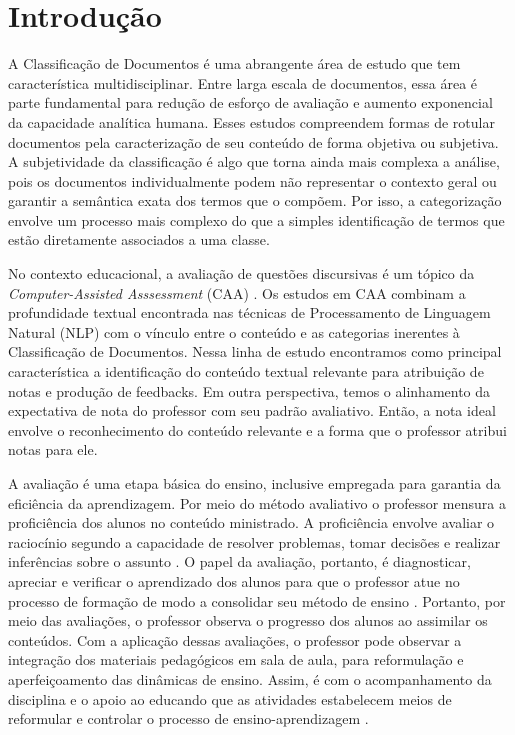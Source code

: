 \chapter{Introdução}
\label{cap1-intro}

A Classificação de Documentos é uma abrangente área de estudo que tem característica multidisciplinar. Entre larga escala de documentos, essa área é parte fundamental para redução de esforço de avaliação e aumento exponencial da capacidade analítica humana. Esses estudos compreendem formas de rotular documentos pela caracterização de seu conteúdo de forma objetiva ou subjetiva. A subjetividade da classificação é algo que torna ainda mais complexa a análise, pois os documentos individualmente podem não representar o contexto geral ou garantir a semântica exata dos termos que o compõem. Por isso, a categorização envolve um processo mais complexo do que a simples identificação de termos que estão diretamente associados a uma classe.

No contexto educacional, a avaliação de questões discursivas é um tópico da \textit{Computer-Assisted Asssessment} (CAA) \cite{bogarin2018}. Os estudos em CAA combinam a profundidade textual encontrada nas técnicas de Processamento de Linguagem Natural (NLP) com o vínculo entre o conteúdo e as categorias inerentes à Classificação de Documentos. Nessa linha de estudo encontramos como principal característica a identificação do conteúdo textual relevante para atribuição de notas e produção de feedbacks. Em outra perspectiva, temos o alinhamento da expectativa de nota do professor com seu padrão avaliativo. Então, a nota ideal envolve o reconhecimento do conteúdo relevante e a forma que o professor atribui notas para ele. 

A avaliação é uma etapa básica do ensino, inclusive empregada para garantia da eficiência da aprendizagem. Por meio do método avaliativo o professor mensura a proficiência dos alunos no conteúdo ministrado. A proficiência envolve avaliar o raciocínio segundo a capacidade de resolver problemas, tomar decisões e realizar inferências sobre o assunto \cite{casiraghi2017}. O papel da avaliação, portanto, é diagnosticar, apreciar e verificar o aprendizado dos alunos para que o professor atue no processo de formação de modo a consolidar seu método de ensino \cite{oliveira2005}. Portanto, por meio das avaliações, o professor observa o progresso dos alunos ao assimilar os conteúdos. Com a aplicação dessas avaliações, o professor pode observar a integração dos materiais pedagógicos em sala de aula, para reformulação e aperfeiçoamento das dinâmicas de ensino. Assim, é com o acompanhamento da disciplina e o apoio ao educando que as atividades estabelecem meios de reformular e controlar o processo de ensino-aprendizagem \cite{barreira2006}.

